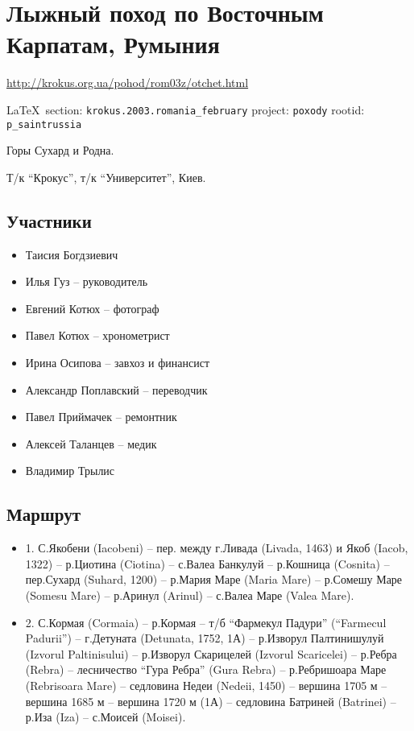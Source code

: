  
 
\section{Лыжный поход по Восточным Карпатам, Румыния}
\url{http://krokus.org.ua/pohod/rom03z/otchet.html}
  
\vspace{0.5cm}
 {\ifDEBUG\small\LaTeX~section: \verb|krokus.2003.romania_february| project: \verb|poxody| rootid: \verb|p_saintrussia| \fi}
\vspace{0.5cm}

Горы Сухард и Родна.

Т/к ``Крокус'', т/к ``Университет'', Киев.

\subsection{Участники}

\begin{itemize}
	\item Таисия Богдзиевич
	\item Илья Гуз – руководитель
	\item Евгений Котюх – фотограф
	\item Павел Котюх – хронометрист
	\item Ирина Осипова – завхоз и финансист
	\item Александр Поплавский – переводчик
	\item Павел Приймачек – ремонтник
	\item Алексей Таланцев – медик
	\item Владимир Трылис
\end{itemize}

\subsection{Маршрут}

\begin{itemize}
\item 1. С.Якобени (Iacobeni) – пер. между г.Ливада (Livada, 1463) и Якоб
				(Iacob, 1322) – р.Циотина (Ciotina) – с.Валеа Банкулуй – р.Кошница
								(Cosnita) – пер.Сухард (Suhard, 1200) – р.Мария Маре (Maria
								Mare) – р.Сомешу Маре (Somesu Mare) – р.Аринул (Arinul) –
								с.Валеа Маре (Valea Mare).

\item 2. С.Кормая (Cormaia) – р.Кормая – т/б “Фармекул Падури” (“Farmecul
				Padurii”) – г.Детуната (Detunata, 1752, 1А) – р.Изворул Палтинишулуй
								(Izvorul Paltinisului) – р.Изворул Скарицелей (Izvorul
								Scaricelei) – р.Ребра (Rebra) – лесничество “Гура Ребра” (Gura
								Rebra) – р.Ребришоара Маре (Rebrisoara Mare) – седловина Недеи
								(Nedeii, 1450) – вершина 1705 м – вершина 1685 м – вершина 1720
								м (1А) – седловина Батриней (Batrinei) – р.Иза (Iza) – с.Моисей
								(Moisei).
\end{itemize}

